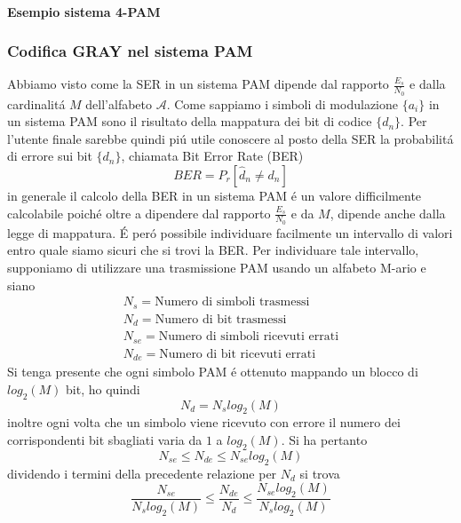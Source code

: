             \paragraph{Esempio sistema 4-PAM}{

            }
        \subsubsection{Codifica GRAY nel sistema PAM}
            Abbiamo visto come la SER in un sistema PAM dipende dal rapporto $\frac{E_s}{N_0}$ e dalla cardinalitá 
            $M$ dell'alfabeto $\mathcal{A}$. Come sappiamo i simboli di modulazione $\{a_i\}$ in un sistema PAM sono
            il risultato della mappatura dei bit di codice $\{d_n\}$. Per l'utente finale sarebbe quindi piú utile 
            conoscere al posto della SER la probabilitá di errore sui bit $\{d_n\}$, chiamata Bit Error Rate (BER)
            \[
                BER = P_r[\hat{d}_n \neq d_n]    
            \] 
            in generale il calcolo della BER in un sistema PAM é un valore difficilmente calcolabile poiché oltre a dipendere
            dal rapporto $\frac{E_s}{N_0}$ e da $M$, dipende anche dalla legge di mappatura. É peró possibile 
            individuare facilmente un intervallo di valori entro quale siamo sicuri che si trovi la BER.
            Per individuare tale intervallo, supponiamo di utilizzare una trasmissione PAM usando un alfabeto
            M-ario e siano
            \begin{gather}
                N_s = \text{Numero di simboli trasmessi}\nonumber \\
                N_d = \text{Numero di bit trasmessi}\nonumber \\
                N_{se} = \text{Numero di simboli ricevuti errati}\nonumber \\
                N_{de} = \text{Numero di bit ricevuti errati}\nonumber 
            \end{gather}
            Si tenga presente che ogni simbolo PAM é ottenuto mappando un blocco di $log_2(M)$ bit, ho quindi
            \[
                N_d = N_slog_2(M)    
            \]
            inoltre ogni volta che un simbolo viene ricevuto con errore il numero dei corrispondenti bit sbagliati 
            varia da $1$ a $log_2(M)$. Si ha pertanto 
            \[
                N_{se} \leq N_{de} \leq N_{se} log_2(M)    
            \]
            dividendo i termini della precedente relazione per $N_d$ si trova
            \[
                \frac{N_{se}}{N_slog_2(M)} \leq \frac{N_{de}}{N_{d}} \leq \frac{N_{se} log_2(M)}{N_{s} log_2(M)}    
            \]
